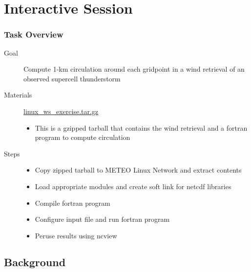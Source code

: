 \documentclass[hyperref,pdfa,unicode,utf8,usepdftitle]{beamer}
\begin{document}
\section{Interactive Session}
\begin{frame}
  \frametitle{Task Overview}
  \begin{description}
  \item[Goal] Compute 1-km circulation around each gridpoint in a wind
    retrieval of an observed supercell thunderstorm
  \item[Materials] \url{linux_ws_exercise.tar.gz}
    \begin{itemize}
    \item This is a gzipped tarball that contains the wind retrieval
      and a fortran program to compute circulation
    \end{itemize}
  \item[Steps]
    \begin{itemize}
    \item Copy zipped tarball to METEO Linux Network and extract
      contents
    \item Load appropriate modules and create soft link for netcdf
      libraries
    \item Compile fortran program
    \item Configure input file and run fortran program
    \item Peruse results using ncview
    \end{itemize}
  \end{description}
\end{frame}

\subsection{Background}
\end{document}
